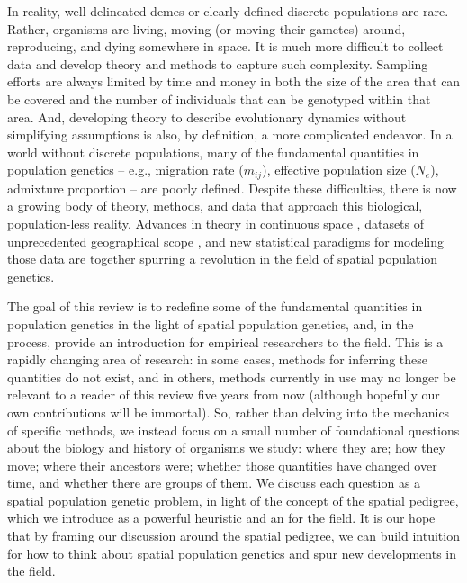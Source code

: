 \documentclass{ar-1col}
\newcommand{\g}[1]{{\color{blue}{#1}}}
\begin{document}
In reality, well-delineated demes or clearly defined discrete populations are rare.
Rather, organisms are living,
moving (or moving their gametes) around,
reproducing, and dying somewhere in space.
It is much more difficult to collect data and develop theory and methods
to capture such complexity.
Sampling efforts are always limited by time and money
in both the size of the area that can be covered
and the number of individuals that can be genotyped within that area.
And, developing theory to describe evolutionary dynamics
without simplifying assumptions is also,
by definition,
a more complicated endeavor.
In a world without discrete populations, 
many of the fundamental quantities in population genetics -- 
e.g., migration rate ($m_{ij}$), 
effective population size ($N_e$),
admixture proportion
--
are poorly defined.
Despite these difficulties,
there is now a growing body of theory, methods, and data
that approach this biological, population-less reality.
Advances in theory in continuous space 
\citep{felsenstein1975pain,BartonWilson1995,barton-depaulis-etheridge, barton2010modelling, barton2010newmodel, Barton2013},
datasets of unprecedented geographical scope 
\citep[e.g.,][]{POBI, Aguillon2017deconstructing, Shaffer195743},
and new statistical paradigms for modeling those data 
\citep{petkova2016visualizing, ringbauer2017inferring, ringbauer2018estimating, conStruct, alasadi2018estimating}
are together spurring a revolution in the field of spatial population genetics.

The goal of this review
is to redefine some of the fundamental quantities in population genetics 
in the light of spatial population genetics, 
and, in the process, provide an introduction for empirical researchers
to the field.
This is a rapidly changing area of research:
in some cases, methods for inferring these quantities do not exist, 
and in others, 
methods currently in use may no longer be relevant
to a reader of this review five years from now
(although hopefully our own contributions will be immortal).
So, rather than delving into the mechanics of specific methods,
we instead focus on a small number of foundational questions 
about the biology and history of organisms we study:
where they are; how they move; where their ancestors were;
whether those quantities have changed over time, 
and whether there are groups of them.
We discuss each question
as a spatial population genetic problem, 
in light of the concept of the spatial pedigree,
which we introduce as a powerful heuristic
and an \g{organizing principle} for the field.
It is our hope that by framing our discussion around the spatial pedigree, 
we can build intuition for how to think about spatial population genetics 
and spur new developments in the field.
\end{document}
